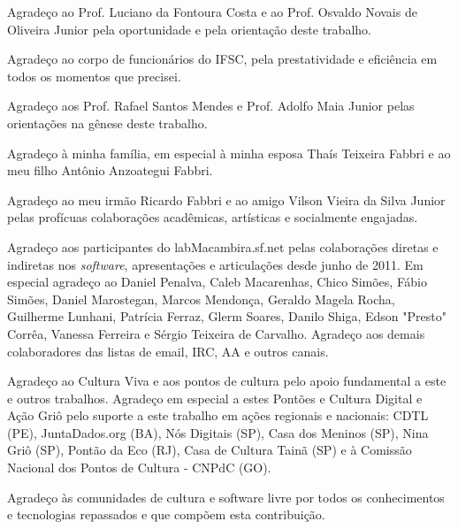 

Agradeço ao Prof. Luciano da Fontoura Costa e ao Prof. Osvaldo Novais de Oliveira Junior pela oportunidade e pela orientação deste trabalho.

\vspace{4 mm}

Agradeço ao corpo de funcionários do IFSC, pela prestatividade e eficiência em todos os momentos que precisei.

\vspace{4 mm}

Agradeço aos Prof. Rafael Santos Mendes e Prof. Adolfo Maia Junior pelas orientações na gênese deste trabalho.

\vspace{4 mm}

Agradeço à minha família, em especial à minha esposa Thaís Teixeira Fabbri e ao meu filho Antônio Anzoategui Fabbri.

\vspace{4 mm}

Agradeço ao meu irmão Ricardo Fabbri e ao amigo Vilson Vieira da Silva Junior pelas profícuas colaborações acadêmicas, artísticas e socialmente engajadas.


\vspace{4 mm}

Agradeço aos participantes do labMacambira.sf.net pelas colaborações diretas e indiretas nos \emph{software}, apresentações e articulações desde junho de 2011. Em especial agradeço ao Daniel Penalva, Caleb Macarenhas, Chico Simões, Fábio Simões, Daniel Marostegan, Marcos Mendonça, Geraldo Magela Rocha, Guilherme Lunhani, Patrícia Ferraz, Glerm Soares, Danilo Shiga, Edson "Presto"\, Corrêa, Vanessa Ferreira e Sérgio Teixeira de Carvalho. Agradeço aos demais colaboradores das listas de email, IRC, AA e outros canais.


\vspace{4 mm}

Agradeço ao Cultura Viva e aos pontos de cultura pelo apoio fundamental a este e outros trabalhos. Agradeço em especial a estes Pontões e Cultura Digital e Ação Griô pelo suporte a este trabalho em ações regionais e nacionais: CDTL (PE), JuntaDados.org (BA), Nós Digitais (SP), Casa dos Meninos (SP), Nina Griô (SP), Pontão da Eco (RJ), Casa de Cultura Tainã (SP) e à Comissão Nacional dos Pontos de Cultura - CNPdC (GO).


\vspace{4 mm}

Agradeço às comunidades de cultura e software livre por todos os conhecimentos e tecnologias repassados e que compõem esta contribuição. 

